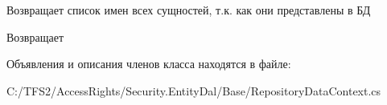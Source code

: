Возвращает список имен всех сущностей, т.\+к. как они представлены в БД 

\begin{DoxyReturn}{Возвращает}

\end{DoxyReturn}


Объявления и описания членов класса находятся в файле\+:\begin{DoxyCompactItemize}
\item 
C\+:/\+T\+F\+S2/\+Access\+Rights/\+Security.\+Entity\+Dal/\+Base/Repository\+Data\+Context.\+cs\end{DoxyCompactItemize}
